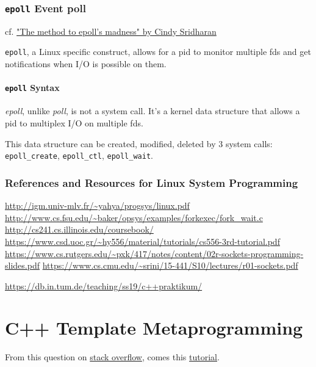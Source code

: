 \documentclass[10pt]{amsart}
\begin{document}
\section{\texttt{epoll} Event poll}

cf. \href{https://medium.com/@copyconstruct/the-method-to-epolls-madness-d9d2d6378642}{"The method to epoll's madness" by Cindy Sridharan}\cite{Srid2017}

\texttt{epoll}, a Linux specific construct, allows for a pid to monitor multiple fds and get notifications when I/O is possible on them. 


\subsection{\texttt{epoll} Syntax}

\emph{epoll}, unlike \emph{poll}, is not a system call. It's a kernel data structure that allows a pid to multiplex I/O on multiple fds.

This data structure can be created, modified, deleted by 3 system calls: \texttt{epoll\_create}, \texttt{epoll\_ctl}, \texttt{epoll\_wait}.

\section{References and Resources for Linux System Programming}

\url{http://igm.univ-mlv.fr/~yahya/progsys/linux.pdf} \\
\url{http://www.cs.fsu.edu/~baker/opsys/examples/forkexec/fork_wait.c} \\
\url{http://cs241.cs.illinois.edu/coursebook/}
\url{https://www.csd.uoc.gr/~hy556/material/tutorials/cs556-3rd-tutorial.pdf}
\url{https://www.cs.rutgers.edu/~pxk/417/notes/content/02r-sockets-programming-slides.pdf}
\url{https://www.cs.cmu.edu/~srini/15-441/S10/lectures/r01-sockets.pdf}

\url{https://db.in.tum.de/teaching/ss19/c++praktikum/}


\part{C++ Template Metaprogramming}

From this question on \href{https://stackoverflow.com/questions/112277/best-introduction-to-c-template-metaprogramming}{stack overflow}, comes this \href{http://www.cs.rpi.edu/~musser/design/blitz/meta-art.html}{tutorial}. 
\end{document}
